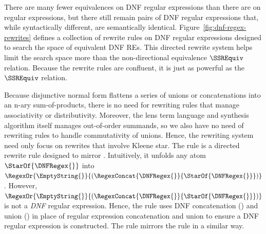 \documentclass[acmsmall,screen]{acmart}
\begin{document}
There are many fewer equivalences on DNF regular expressions than there are on
regular expressions, but there
still remain pairs of DNF regular expressions that, while syntactically different,
are semantically identical.  
Figure~\ref{fig:dnf-regex-rewrites} defines a collection of rewrite rules on DNF regular expressions
designed to search the space of equivalent DNF REs.  
This directed rewrite system helps limit
the search space more than the non-directional equivalence $\SSREquiv$ relation.
Because the rewrite rules are confluent, it is just as powerful as the
$\SSREquiv$ relation.
 

Because disjunctive normal form flattens a series of unions or concatenations
into an n-ary sum-of-products,
there is no need for rewriting rules that manage associativity or
distributivity.  Moreover, the lens term language and synthesis algorithm itself manages out-of-order summands, so we also have no need of rewriting
rules to handle commutativity of unions.  Hence, the rewriting system
need only focus on rewrites that involve Kleene star.
The rule \AtomUnrollstarLeftRule{} is a directed rewrite rule
designed to mirror \UnrollstarLeftRule{}.  Intuitively, it unfolds any atom 
$\StarOf{\DNFRegex{}}$ into $\RegexOr{\EmptyString{}}{(\RegexConcat{\DNFRegex{}}{\StarOf{{\DNFRegex{}}}})}$.  However, 
$\RegexOr{\EmptyString{}}{(\RegexConcat{\DNFRegex{}}{\StarOf{{\DNFRegex{}}}})}$ is
not a \emph{DNF} regular expression.  Hence, the rule uses DNF concatenation (\ConcatDNF)
and union (\OrDNF) in place of regular expression concatenation and union
to ensure a DNF regular expression is constructed.  The rule
\AtomUnrollstarRightRule{} mirrors the rule \UnrollstarRightRule{} in 
a similar way.
\end{document}
